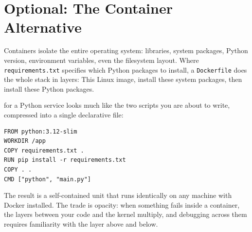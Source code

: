 

\newpage
\section{Optional: The Container Alternative}

Containers isolate the entire operating system: libraries, system packages,
Python version, environment variables, even the filesystem layout.
Where \texttt{requirements.txt} specifies which Python packages to install,
a \texttt{Dockerfile} does the whole stack in layers: This Linux image,
install these system packages, then install these Python packages.


 for a Python service looks much like the
two scripts you are about to write, compressed into a single declarative file:

\begin{verbatim}
FROM python:3.12-slim
WORKDIR /app
COPY requirements.txt .
RUN pip install -r requirements.txt
COPY . .
CMD ["python", "main.py"]
\end{verbatim}

The result is a self-contained unit that runs identically on any machine
with Docker installed.
The trade is opacity: when something fails inside a container, the layers
between your code and the kernel multiply, and debugging across them
requires familiarity with the layer above and below.

